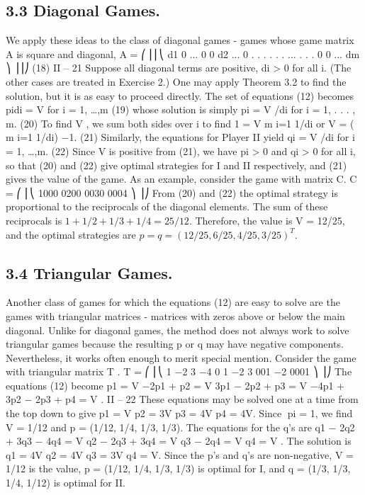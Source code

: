 \documentclass[]{report}
\begin{document}
\subsection{3.3 Diagonal Games.} We apply these ideas to the class of diagonal games - games
whose game matrix A is square and diagonal,
A =
⎛
⎜⎜⎝
d1 0 ... 0
0 d2 ... 0 .
.
. .
.
. ... .
.
.
0 0 ... dm
⎞
⎟⎟⎠
(18)
II – 21
Suppose all diagonal terms are positive, di > 0 for all i. (The other cases are treated in
Exercise 2.) One may apply Theorem 3.2 to find the solution, but it is as easy to proceed
directly. The set of equations (12) becomes
pidi = V for i = 1, \ldots,m (19)
whose solution is simply
pi = V /di for i = 1, . . . , m. (20)
To find V , we sum both sides over i to find
1 = V 
m
i=1
1/di or V = (
m
i=1
1/di)
−1. (21)
Similarly, the equations for Player II yield
qi = V /di for i = 1, \ldots,m. (22)
Since V is positive from (21), we have pi > 0 and qi > 0 for all i, so that (20) and (22)
give optimal strategies for I and II respectively, and (21) gives the value of the game.
As an example, consider the game with matrix C.
C =
⎛
⎜⎝
1000
0200
0030
0004
⎞
⎟⎠
From (20) and (22) the optimal strategy is proportional to the reciprocals of the diagonal
elements. The sum of these reciprocals is $1 + 1/2+1/3+1/4 = 25/12$. Therefore, the
value is V = 12/25, and the optimal strategies are $p = q = (12/25, 6/25, 4/25, 3/25)^T$.
\subsection{3.4 Triangular Games.} Another class of games for which the equations (12) are
easy to solve are the games with triangular matrices - matrices with zeros above or below
the main diagonal. Unlike for diagonal games, the method does not always work to solve
triangular games because the resulting p or q may have negative components. Nevertheless,
it works often enough to merit special mention. Consider the game with triangular matrix
T .
T =
⎛
⎜⎝
1 −2 3 −4
0 1 −2 3
001 −2
0001
⎞
⎟⎠
The equations (12) become
p1 = V
−2p1 + p2 = V
3p1 − 2p2 + p3 = V
−4p1 + 3p2 − 2p3 + p4 = V .
II – 22
These equations may be solved one at a time from the top down to give
p1 = V p2 = 3V p3 = 4V p4 = 4V.
Since pi = 1, we find V = 1/12 and p = (1/12, 1/4, 1/3, 1/3). The equations for the q’s
are
q1 − 2q2 + 3q3 − 4q4 = V
q2 − 2q3 + 3q4 = V
q3 − 2q4 = V
q4 = V .
The solution is
q1 = 4V q2 = 4V q3 = 3V q4 = V.
Since the p’s and q’s are non-negative, V = 1/12 is the value, p = (1/12, 1/4, 1/3, 1/3) is
optimal for I, and q = (1/3, 1/3, 1/4, 1/12) is optimal for II.
\end{document}
